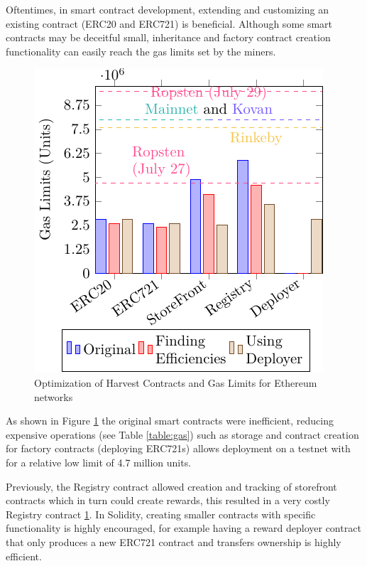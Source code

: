 \documentclass[12pt,tightenlines,letterpaper]{scrartcl}
\begin{document}
  Oftentimes, in smart contract development, extending and customizing an existing contract (ERC20 and ERC721) is beneficial.
  Although some smart contracts may be deceitful small, inheritance and factory contract creation functionality can easily reach the gas limits set by the miners. 
  
  
\begin{figure}[H]
\centering
\includegraphics[width=1\linewidth]{Images/gasCost}
\caption{Optimization of Harvest Contracts and Gas Limits for Ethereum networks}
\label{fig:gascost}
\end{figure}
As shown in Figure \ref{fig:gascost} the original smart contracts were inefficient, reducing expensive operations (see Table \ref{table:gas}) such as storage and contract creation for factory contracts (deploying ERC721s) allows deployment on a testnet with for a relative low limit of 4.7 million units.

Previously, the Registry contract allowed creation and tracking of storefront contracts which in turn could create rewards, this resulted in a very costly Registry contract \ref{fig:gascost}.
In Solidity, creating smaller contracts with specific functionality is highly encouraged, for example having a reward deployer contract that only produces a new ERC721 contract and transfers ownership is highly efficient.
 
\end{document}
